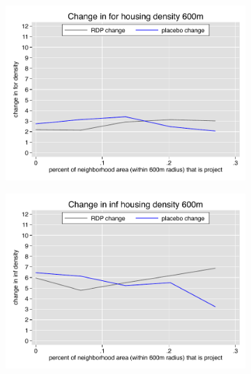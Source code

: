 \documentclass[12pt]{article}
\begin{document}
\begin{figure}
        \vspace{-6mm}
        \begin{subfigure}[b]{0.495\textwidth}
            \centering
            \includegraphics[width=\textwidth,trim={0.3cm .3cm 0.1cm 0cm}, clip=true]{figures/change_for_600_total.pdf}
        \end{subfigure}
        \hfill
        \begin{subfigure}[b]{0.495\textwidth}  
            \centering 
            \includegraphics[width=\textwidth,trim={0.3cm .3cm 0.1cm 0cm}, clip=true]{figures/change_inf_600_total.pdf}
        \end{subfigure}
        \vspace{-6mm}
    \end{figure} 
\end{document}
